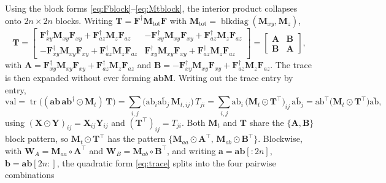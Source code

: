 \documentclass[11pt]{article}
\theoremstyle{remark}
\newcommand{\fa}{\mathbf{a}}
\newcommand{\fb}{\mathbf{b}}
\DeclareMathOperator{\blkdiag}{blkdiag}
\DeclareMathOperator{\tr}{tr}
\begin{document}
Using the block forms \eqref{eq:Fblock}--\eqref{eq:Mtblock},
the interior product collapses onto $2n\times2n$ blocks. Writing
$\mathbf{T}=\mathbf{F}^\dagger\mathbf{M}_{\mathrm{tot}}\mathbf{F}$ with
$\mathbf{M}_{\mathrm{tot}}=\blkdiag(\mathbf{M}_{xy},\mathbf{M}_z)$,
\begin{equation}
\mathbf{T}=
\begin{bmatrix}
\mathbf{F}_{xy}^\dagger\mathbf{M}_{xy}\mathbf{F}_{xy}+\mathbf{F}_{az}^\dagger\mathbf{M}_z\mathbf{F}_{az} &
-\mathbf{F}_{xy}^\dagger\mathbf{M}_{xy}\mathbf{F}_{xy}+\mathbf{F}_{az}^\dagger\mathbf{M}_z\mathbf{F}_{az}\\[2pt]
-\mathbf{F}_{xy}^\dagger\mathbf{M}_{xy}\mathbf{F}_{xy}+\mathbf{F}_{az}^\dagger\mathbf{M}_z\mathbf{F}_{az} &
\mathbf{F}_{xy}^\dagger\mathbf{M}_{xy}\mathbf{F}_{xy}+\mathbf{F}_{az}^\dagger\mathbf{M}_z\mathbf{F}_{az}
\end{bmatrix}
=
\begin{bmatrix}\mathbf{A}&\mathbf{B}\\
\mathbf{B}&\mathbf{A}\end{bmatrix},
\label{eq:Tblock}
\end{equation}
with $\mathbf{A}=\mathbf{F}_{xy}^\dagger\mathbf{M}_{xy}\mathbf{F}_{xy}+
\mathbf{F}_{az}^\dagger\mathbf{M}_z\mathbf{F}_{az}$ and
$\mathbf{B}=-\mathbf{F}_{xy}^\dagger\mathbf{M}_{xy}\mathbf{F}_{xy}+
\mathbf{F}_{az}^\dagger\mathbf{M}_z\mathbf{F}_{az}$. The trace is then expanded
without ever forming $\mathbf{abM}$.  Writing out the trace entry by entry,
\begin{equation}
\mathrm{val}=\tr\big((\mathbf{ab}\,\mathbf{ab}^\dagger\odot\mathbf{M}_t)\,\mathbf{T}\big)
=\sum_{i,j}\big(\mathrm{ab}_i\overline{\mathrm{ab}_j}\,
\mathbf{M}_{t,ij}\big)\,T_{ji}
=\sum_{i,j}\mathrm{ab}_i\,\big(\mathbf{M}_t\odot\mathbf{T}^{\top}\big)_{ij}\,
\overline{\mathrm{ab}_j}
=\mathrm{ab}^{\top}\big(\mathbf{M}_t\odot\mathbf{T}^{\top}\big)\overline{\mathrm{ab}},
\label{eq:trace}
\end{equation}
using $(\mathbf{X}\odot\mathbf{Y})_{ij}=\mathbf{X}_{ij}\mathbf{Y}_{ij}$ and
$(\mathbf{T}^{\top})_{ij}=T_{ji}$.  Both $\mathbf{M}_t$ and
$\mathbf{T}$ share the $\{\mathbf{A},\mathbf{B}\}$ block pattern, so
$\mathbf{M}_t\odot\mathbf{T}^{\top}$ has the pattern
$\{\mathbf{M}_{aa}\odot\mathbf{A}^{\top},\,
\mathbf{M}_{ab}\odot\mathbf{B}^{\top}\}$.  Blockwise, with
$\mathbf{W}_A=\mathbf{M}_{aa}\circ\mathbf{A}^{\top}$ and
$\mathbf{W}_B=\mathbf{M}_{ab}\circ\mathbf{B}^{\top}$, and writing
$\fa=\mathbf{ab}[:2n]$, $\fb=\mathbf{ab}[2n:]$, the quadratic form
\eqref{eq:trace} splits into the four pairwise combinations
\end{document}
